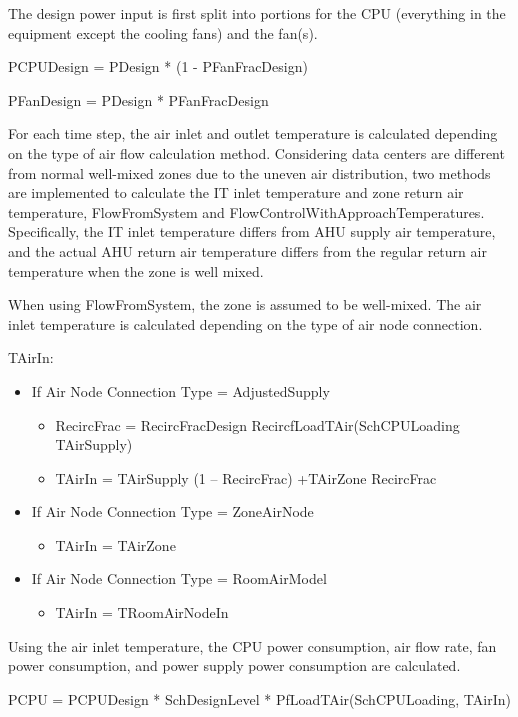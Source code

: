 The design power input is first split into portions for the CPU (everything in the equipment except the cooling fans) and the fan(s).

PCPUDesign = PDesign * (1 - PFanFracDesign)

PFanDesign = PDesign * PFanFracDesign

For each time step,  the air inlet and outlet temperature is calculated depending on the type of air flow calculation method. Considering data centers are different from normal well-mixed zones due to the uneven air distribution, two methods are implemented to calculate the IT inlet temperature and zone return air temperature, FlowFromSystem and FlowControlWithApproachTemperatures. Specifically, the IT inlet temperature differs from AHU supply air temperature, and the actual AHU return air temperature differs from the regular return air temperature when the zone is well mixed.

When using FlowFromSystem, the zone is assumed to be well-mixed. The air inlet temperature is calculated depending on the type of air node connection.

TAirIn:

\begin{itemize}
    \tightlist
  \item
    If Air Node Connection Type = AdjustedSupply
    \begin{itemize}
      \item RecircFrac = RecircFracDesign \* RecircfLoadTAir(SchCPULoading TAirSupply)
      \item TAirIn = TAirSupply \* (1 – RecircFrac) +TAirZone \* RecircFrac
    \end{itemize}
  \item
    If Air Node Connection Type = ZoneAirNode
    \begin{itemize}
      \item   TAirIn = TAirZone
    \end{itemize}
  \item
    If Air Node Connection Type = RoomAirModel
    \begin{itemize}
      \item TAirIn = TRoomAirNodeIn
    \end{itemize}
\end{itemize}

Using the air inlet temperature, the CPU power consumption, air flow rate, fan power consumption, and power supply power consumption are calculated.

PCPU = PCPUDesign * SchDesignLevel * PfLoadTAir(SchCPULoading, TAirIn)

